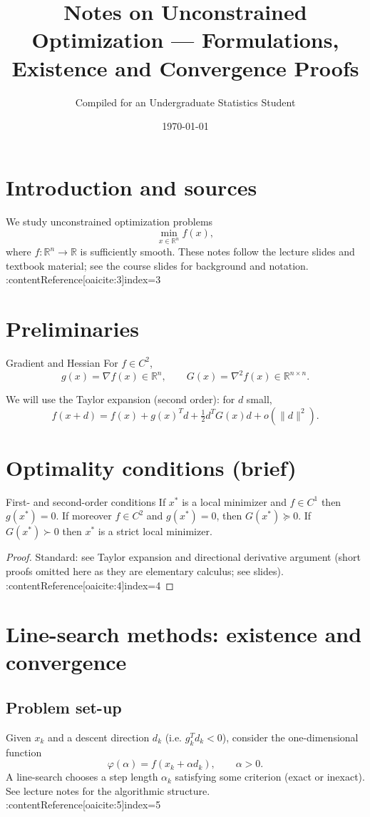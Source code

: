\documentclass{MathNote}
\title{Notes on Unconstrained Optimization — Formulations, Existence and Convergence Proofs}
\author{Compiled for an Undergraduate Statistics Student}
\date{\today}
\begin{document}
\maketitle
\tableofcontents

\section{Introduction and sources}
We study unconstrained optimization problems
\[
  \min_{x\in\mathbb{R}^n} f(x),
\]
where \(f:\mathbb{R}^n\to\mathbb{R}\) is sufficiently smooth. These notes follow the lecture slides and textbook material; see the course slides for background and notation. :contentReference[oaicite:3]{index=3}

\section{Preliminaries}
\begin{definition}{Gradient and Hessian}{}
For \(f\in C^2\),
\[
g(x)=\nabla f(x)\in\mathbb{R}^n,\qquad G(x)=\nabla^2 f(x)\in\mathbb{R}^{n\times n}.
\]
\end{definition}

We will use the Taylor expansion (second order): for \(d\) small,
\[
f(x+d)=f(x)+g(x)^T d+\tfrac12 d^T G(x) d + o(\|d\|^2).
\]

\section{Optimality conditions (brief)}
\begin{theorem}{First- and second-order conditions}{}
If \(x^*\) is a local minimizer and \(f\in C^1\) then \(g(x^*)=0\).
If moreover \(f\in C^2\) and \(g(x^*)=0\), then \(G(x^*)\succeq 0\). If \(G(x^*)\succ0\) then \(x^*\) is a strict local minimizer.
\end{theorem}
\begin{proof}
Standard: see Taylor expansion and directional derivative argument (short proofs omitted here as they are elementary calculus; see slides). :contentReference[oaicite:4]{index=4}
\end{proof}

\section{Line-search methods: existence and convergence}

\subsection{Problem set-up}
Given \(x_k\) and a descent direction \(d_k\) (i.e. \(g_k^T d_k<0\)), consider the one-dimensional function
\[
\varphi(\alpha)=f(x_k+\alpha d_k),\qquad \alpha>0.
\]
A line-search chooses a step length \(\alpha_k\) satisfying some criterion (exact or inexact). See lecture notes for the algorithmic structure. :contentReference[oaicite:5]{index=5}
\end{document}
